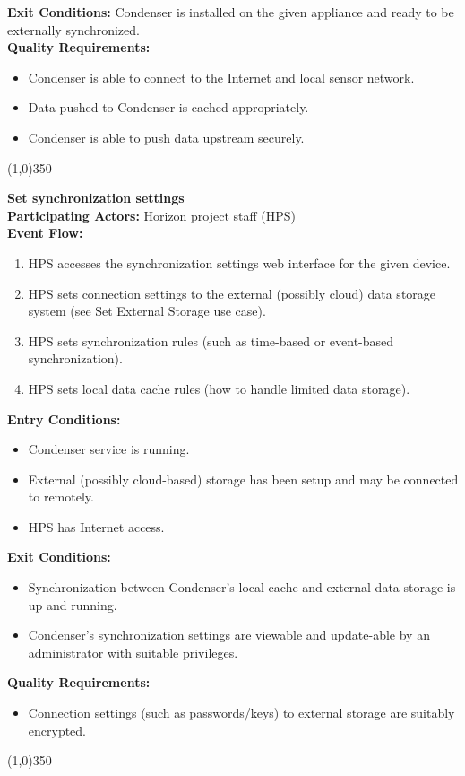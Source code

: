 		\textbf{Exit Conditions:} Condenser is installed on the given appliance and ready to be externally synchronized.\\
		\textbf{Quality Requirements:}
		\begin{itemize}
\item Condenser is able to connect to the Internet and local sensor network.
\item Data pushed to Condenser is cached appropriately.
\item Condenser is able to push data upstream securely.
		\end{itemize}
		\line(1,0){350}		
		
		\textbf{Set synchronization settings}\\ 
		\textbf{Participating Actors:} Horizon project staff (HPS) \\
		\textbf{Event Flow:}
		\begin{enumerate}
\item HPS accesses the synchronization settings web interface for the given device.
\item HPS sets connection settings to the external (possibly cloud) data storage system (see Set External Storage use case).
\item HPS sets synchronization rules (such as time-based or event-based synchronization). 
\item HPS sets local data cache rules (how to handle limited data storage).
	    \end{enumerate}
		\textbf{Entry Conditions:}
		\begin{itemize}
\item Condenser service is running.
\item External (possibly cloud-based) storage has been setup and may be connected to remotely.
\item HPS has Internet access.
		\end{itemize}		 
		\textbf{Exit Conditions:}
		\begin{itemize}
\item Synchronization between Condenser's local cache and external data storage is up and running.
\item Condenser's synchronization settings are viewable and update-able by an administrator with suitable privileges.
		\end{itemize}			
		\textbf{Quality Requirements:}
		\begin{itemize}
\item Connection settings (such as passwords/keys) to external storage are suitably encrypted.
		\end{itemize}		
		\line(1,0){350}		

